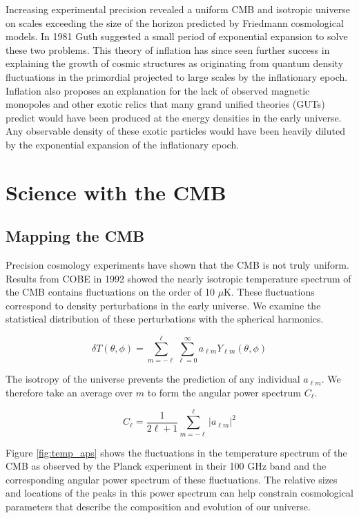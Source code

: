 \documentclass[12pt]{article}
\begin{document}
Increasing experimental precision revealed a uniform CMB and isotropic
universe on scales exceeding the size of the horizon predicted by
Friedmann cosmological models. In 1981 Guth suggested a small period of
exponential expansion to solve these two problems\cite{cite:Guth}. This theory of inflation
has since seen further success in explaining the growth of cosmic structures
as originating from quantum density fluctuations in the primordial projected
to large scales by the inflationary epoch. Inflation also proposes an
explanation for the lack of observed magnetic monopoles and other exotic
relics that many grand unified theories (GUTs) predict would have been
produced at the energy densities in the early universe. Any observable
density of these exotic particles would have been heavily diluted by the
exponential expansion of the inflationary epoch.





\section{Science with the CMB}

\subsection{Mapping the CMB}
Precision cosmology experiments have shown that the CMB is not truly uniform.
Results from COBE in 1992\cite{cite:COBE} showed the nearly
isotropic temperature spectrum of the CMB contains
fluctuations on the order of 10 $\mu$K. These fluctuations correspond to
density perturbations in the early universe.  We examine the statistical
distribution of these perturbations with the spherical harmonics.


\begin{equation}
	\delta T(\theta,\phi) = \sum _{m=-\ell} ^\ell \sum _{\ell=0} ^\infty
	a_{\ell m}Y_{\ell m}(\theta,\phi)
\end{equation}


The isotropy of the universe prevents the prediction of any individual $a_{\ell
m}$. We therefore take an average over $m$ to form the
angular power spectrum $C_\ell$.

\begin{equation}
	C_{\ell} = \frac{1}{2\ell +1}\sum _{m=-\ell} ^\ell |a_{\ell m}|^2
\end{equation}


Figure \ref{fig:temp_aps} shows the fluctuations in the temperature spectrum
of the CMB as observed by the Planck experiment in their 100 GHz band and the
corresponding angular power spectrum of these fluctuations. The relative sizes
and locations of the peaks in this power spectrum can help constrain
cosmological parameters that describe the composition and evolution of our
universe. 
\end{document}
